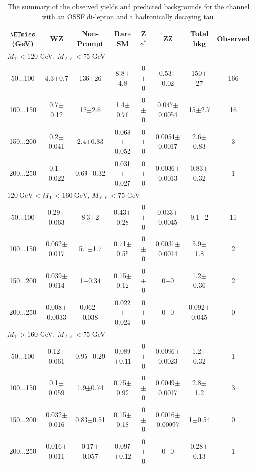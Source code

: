 \begin{landscape}
\begin{table}
\begin{center}
\caption{\label{tab:OSSF1tau1} The summary of the observed yields and predicted backgrounds for the channel with an OSSF di-lepton and a hadronically decaying tau. }
\begin{tabular}{| c | c c c c c c c | }\hline\hline
$\ETmiss$ (GeV) & WZ & Non-Prompt & Rare SM & Z$\gamma^*$ & ZZ & Total bkg & Observed\\\hline\hline
\multicolumn{8}{l}{$M_{\text{T}} < 120$ GeV, $M_{\ell\ell} < 75$ GeV}\\\hline\hline
50$\dots$100&4.3$\pm$0.7&136$\pm$26&8.8$\pm$4.8&0$\pm$0&0.53$\pm$0.02&150$\pm$27&166\\
100$\dots$150&0.7$\pm$0.12&13$\pm$2.6&1.4$\pm$0.76&0$\pm$0&0.047$\pm$0.0054&15$\pm$2.7&16\\
150$\dots$200&0.2$\pm$0.041&2.4$\pm$0.83&0.068$\pm$0.052&0$\pm$0&0.0054$\pm$0.0017&2.6$\pm$0.83&3\\
200$\dots$250&0.1$\pm$0.022&0.69$\pm$0.32&0.031$\pm$0.027&0$\pm$0&0.0036$\pm$0.0013&0.83$\pm$0.32&1\\
\hline\hline
\multicolumn{8}{l}{$120~\mathrm{GeV} < M_{\text{T}} < 160~\mathrm{GeV}$, $M_{\ell\ell} < 75$ GeV}\\\hline\hline
50$\dots$100&0.29$\pm$0.063&8.3$\pm$2&0.43$\pm$0.28&0$\pm$0&0.033$\pm$0.0045&9.1$\pm$2&11\\
100$\dots$150&0.062$\pm$0.017&5.1$\pm$1.7&0.71$\pm$0.55&0$\pm$0&0.0031$\pm$0.0014&5.9$\pm$1.8&2\\
150$\dots$200&0.039$\pm$0.014&1$\pm$0.34&0.15$\pm$0.12&0$\pm$0&0$\pm$0&1.2$\pm$0.36&2\\
200$\dots$250&0.008$\pm$0.0033&0.062$\pm$0.038&0.022$\pm$0.024&0$\pm$0&0$\pm$0&0.092$\pm$0.045&0\\
\hline\hline
\multicolumn{8}{l}{$M_{\text{T}} > 160$ GeV, $M_{\ell\ell} < 75$ GeV}\\\hline\hline
50$\dots$100&0.12$\pm$0.061&0.95$\pm$0.29&0.089$\pm$0.11&0$\pm$0&0.0096$\pm$0.0023&1.2$\pm$0.32&1\\
100$\dots$150&0.1$\pm$0.059&1.9$\pm$0.74&0.75$\pm$0.92&0$\pm$0&0.0049$\pm$0.0017&2.8$\pm$1.2&3\\
150$\dots$200&0.032$\pm$0.016&0.83$\pm$0.51&0.15$\pm$0.18&0$\pm$0&0.0016$\pm$0.00097&1$\pm$0.54&0\\
200$\dots$250&0.016$\pm$0.011&0.17$\pm$0.057&0.097$\pm$0.12&0$\pm$0&0$\pm$0&0.28$\pm$0.13&1\\

\end{tabular}
\end{center}
\end{table}
\end{landscape}
